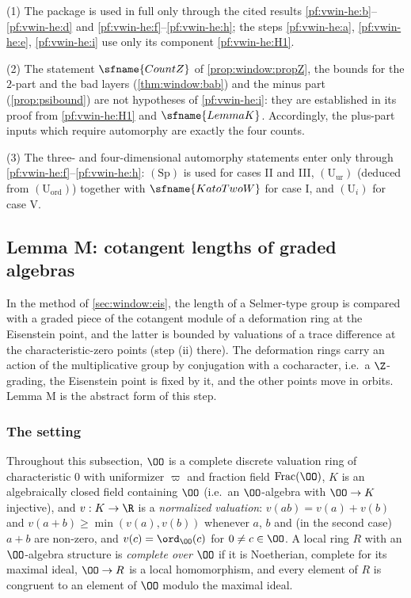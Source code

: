 \begin{remark}\label{pf:vwin-he:rem-structure}
(1) The package is used in full only through the cited results \ref{pf:vwin-he:b}--\ref{pf:vwin-he:d} and
\ref{pf:vwin-he:f}--\ref{pf:vwin-he:h}; the steps \ref{pf:vwin-he:a}, \ref{pf:vwin-he:e}, \ref{pf:vwin-he:i} use
only its component \ref{pf:vwin-he:H1}.

(2) The statement $\sfname{CountZ}$ of \cref{prop:window:propZ}, the bounds for the $2$-part and the bad layers
(\cref{thm:window:bab}) and the minus part (\cref{prop:psibound}) are not hypotheses of \ref{pf:vwin-he:i}: they are
established in its proof from \ref{pf:vwin-he:H1} and $\sfname{LemmaK}$. Accordingly, the plus-part inputs which
require automorphy are exactly the four counts.

(3) The three- and four-dimensional automorphy statements enter only through
\ref{pf:vwin-he:f}--\ref{pf:vwin-he:h}: $(\mathrm{Sp})$ is used for cases II and III, $(\mathrm{U}_{\mathrm{ur}})$
(deduced from $(\mathrm{U}_{\mathrm{ord}})$) together with $\sfname{KatoTwoW}$ for case I, and $(\mathrm{U}_i)$ for
case V.
\end{remark}

\subsection{Lemma M: cotangent lengths of graded algebras}\label{sec:pf:vwin-he:lemmaM}

In the method of \cref{sec:window:eis}, the length of a Selmer-type group is compared with a graded piece of the
cotangent module of a deformation ring at the Eisenstein point, and the latter is bounded by valuations of a trace
difference at the characteristic-zero points (step (ii) there). The deformation rings carry an action of the
multiplicative group by conjugation with a cocharacter, i.e.\ a $\Z$-grading, the Eisenstein point is fixed by it,
and the other points move in orbits. Lemma M is the abstract form of this step.

\subsubsection{The setting}

Throughout this subsection, $\OO$ is a complete discrete valuation ring of characteristic $0$ with uniformizer
$\varpi$ and fraction field $\mathrm{Frac}(\OO)$, $K$ is an algebraically closed field containing $\OO$ (i.e.\ an
$\OO$-algebra with $\OO\to K$ injective), and $v:K\to\R$ is a \emph{normalized valuation}: $v(ab)=v(a)+v(b)$ and
$v(a+b)\ge\min(v(a),v(b))$ whenever $a$, $b$ and (in the second case) $a+b$ are non-zero, and $v(c)=\ord_\OO(c)$ for
$0\ne c\in\OO$. A local ring $R$ with an $\OO$-algebra structure is \emph{complete over $\OO$} if it is Noetherian,
complete for its maximal ideal, $\OO\to R$ is a local homomorphism, and every element of $R$ is congruent to an
element of $\OO$ modulo the maximal ideal.


